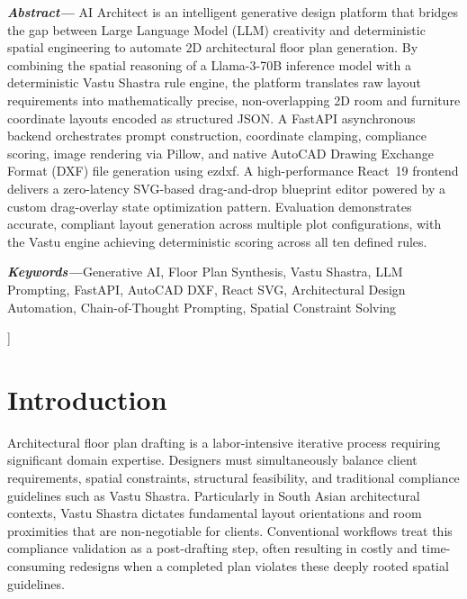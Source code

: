 \documentclass[10pt, twocolumn, letterpaper]{article}
\begin{document}
\begin{center}
\begin{minipage}{0.92\linewidth}
\fontsize{9}{11}\selectfont
\noindent\textbf{\textit{Abstract---}}%
AI Architect is an intelligent generative design platform that bridges the
gap between Large Language Model (LLM) creativity and deterministic spatial
engineering to automate 2D architectural floor plan generation. By combining
the spatial reasoning of a Llama-3-70B inference model with a deterministic
Vastu Shastra rule engine, the platform translates raw layout requirements
into mathematically precise, non-overlapping 2D room and furniture coordinate
layouts encoded as structured JSON. A FastAPI asynchronous backend
orchestrates prompt construction, coordinate clamping, compliance scoring,
image rendering via Pillow, and native AutoCAD Drawing Exchange Format (DXF)
file generation using ezdxf. A high-performance React~19 frontend delivers a
zero-latency SVG-based drag-and-drop blueprint editor powered by a custom
drag-overlay state optimization pattern. Evaluation demonstrates accurate,
compliant layout generation across multiple plot configurations, with the
Vastu engine achieving deterministic scoring across all ten defined rules.

\vspace{4pt}
\noindent\textbf{\textit{Keywords---}}Generative AI, Floor Plan Synthesis,
Vastu Shastra, LLM Prompting, FastAPI, AutoCAD DXF, React SVG,
Architectural Design Automation, Chain-of-Thought Prompting,
Spatial Constraint Solving
\end{minipage}

\vspace{12pt}
\end{center}
]%

\section{Introduction}

Architectural floor plan drafting is a labor-intensive iterative process
requiring significant domain expertise. Designers must simultaneously balance
client requirements, spatial constraints, structural feasibility, and
traditional compliance guidelines such as Vastu Shastra. Particularly in
South Asian architectural contexts, Vastu Shastra dictates fundamental layout
orientations and room proximities that are non-negotiable for clients.
Conventional workflows treat this compliance validation as a post-drafting
step, often resulting in costly and time-consuming redesigns when a completed
plan violates these deeply rooted spatial guidelines.
\end{document}
